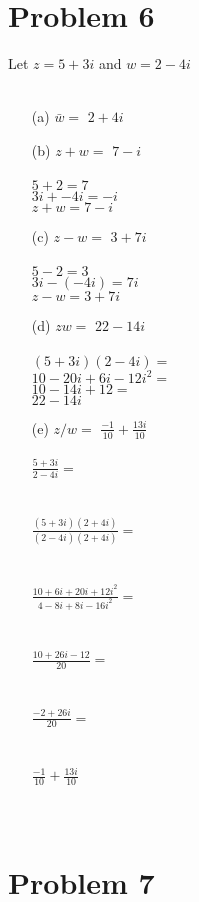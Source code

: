 \documentclass[12pt]{article}
\begin{document}
\section{Problem 6}
Let $z = 5 + 3i$ and $w = 2 - 4i$\\ \\

\begin{enumerate}
\item[(a)] $\bar{w} =$  {\Large$2 + 4i$ }\\
\item[(b)] $z + w = $  {\Large$7 - i$}\\  \\
$ 5 + 2 = 7$\\
$3i + -4i = -i $\\
$z + w = 7 - i$\\
\item[(c)]$z - w =$ {\Large$3 + 7i$}\\ \\
$5 - 2 = 3$\\
$3i - (-4i) = 7i$\\
$z - w = 3 + 7i$\\
\item[(d)] $zw = $ {\Large$22 - 14i$}\\ \\
$(5 + 3i)(2 - 4i) = $\\
$10 - 20i + 6i - 12i^2 = $\\
$10 - 14i + 12 = $\\
$22 - 14i$\\
\item[(e)] $z/w = $ {\Large$\frac{-1}{10} + \frac{13i}{10}$}\\ \\

{\Large $\frac{5 + 3i}{2 - 4i} = $\\ \\ \\
$\frac{(5 + 3i)(2 + 4i)}{(2 - 4i)(2 + 4i)} = $\\ \\ \\
$\frac{10 + 6i + 20i + 12i^2}{4 - 8i + 8i -16i^2} = $\\ \\ \\
$\frac{10 + 26i - 12}{20} = $\\ \\ \\
$\frac{-2 + 26i}{20} = $\\ \\ \\
$\frac{-1}{10} + \frac{13i}{10}$\\  \\ \\}
\end{enumerate}

\section{Problem 7}



\end{document}

